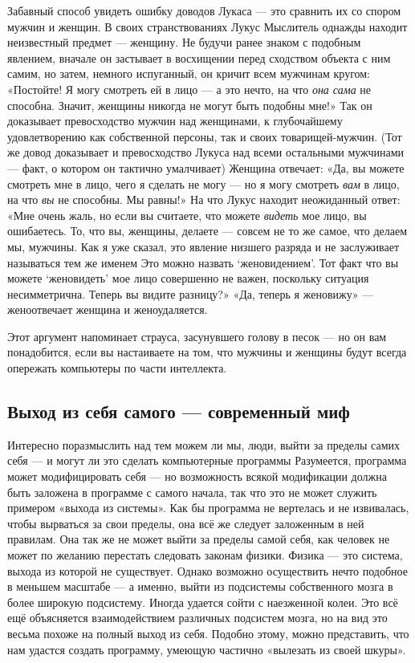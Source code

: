 \documentclass[../main.tex]{subfiles}
\begin{document}
Забавный способ увидеть ошибку доводов Лукаса --- это сравнить их со спором мужчин и женщин. В своих странствованиях Лукус Мыслитель однажды находит неизвестный предмет --- женщину. Не будучи ранее знаком с подобным явлением, вначале он застывает в восхищении перед сходством объекта с ним самим, но затем, немного испуганный, он кричит всем мужчинам кругом: «Постойте! Я могу смотреть ей в лицо --- а это нечто, на что \emph{она сама} не способна. Значит, женщины никогда не могут быть подобны мне!» Так он доказывает превосходство мужчин над женщинами, к глубочайшему удовлетворению как собственной персоны, так и своих товарищей-мужчин. (Тот же довод доказывает и превосходство Лукуса над всеми остальными мужчинами --- факт, о котором он тактично умалчивает) Женщина отвечает: «Да, вы можете смотреть мне в лицо, чего я сделать не могу --- но я могу смотреть \emph{вам} в лицо, на что \emph{вы} не способны. Мы равны!» На что Лукус находит неожиданный ответ: «Мне очень жаль, но если вы считаете, что можете \emph{видеть} мое лицо, вы ошибаетесь. То, что вы, женщины, делаете --- совсем не то же самое, что делаем мы, мужчины. Как я уже сказал, это явление низшего разряда и не заслуживает называться тем же именем Это можно назвать \enquote*{женовидением}. Тот факт что вы можете \enquote*{женовидеть} мое лицо совершенно не важен, поскольку ситуация несимметрична. Теперь вы видите разницу?» «Да, теперь я женовижу» --- женоотвечает женщина и женоудаляется.

Этот аргумент напоминает страуса, засунувшего голову в песок --- но он вам понадобится, если вы настаиваете на том, что мужчины и женщины будут всегда опережать компьютеры по части интеллекта.


\subsection{Выход из себя самого --- современный миф}

Интересно поразмыслить над тем можем ли мы, люди, выйти за пределы самих себя --- и могут ли это сделать компьютерные программы Разумеется, программа может модифицировать себя --- но возможность всякой модификации должна быть заложена в программе с самого начала, так что это не может служить примером «выхода из системы». Как бы программа не вертелась и не извивалась, чтобы вырваться за свои пределы, она всё же следует заложенным в ней правилам. Она так же не может выйти за пределы самой себя, как человек не может по желанию перестать следовать законам физики. Физика --- это система, выхода из которой не существует. Однако возможно осуществить нечто подобное в меньшем масштабе --- а именно, выйти из подсистемы собственного мозга в более широкую подсистему. Иногда удается сойти с наезженной колеи. Это всё ещё объясняется взаимодействием различных подсистем мозга, но на вид это весьма похоже на полный выход из себя. Подобно этому, можно представить, что нам удастся создать программу, умеющую частично «вылезать из своей шкуры».
\end{document}
